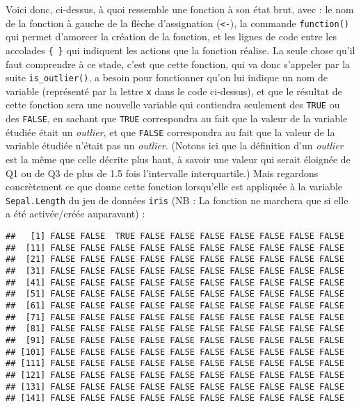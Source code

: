 \documentclass[
]{book}
\newenvironment{Shaded}{\begin{snugshade}}{\end{snugshade}}
\newcommand{\AttributeTok}[1]{\textcolor[rgb]{0.77,0.63,0.00}{#1}}
\newcommand{\FunctionTok}[1]{\textcolor[rgb]{0.00,0.00,0.00}{#1}}
\newcommand{\NormalTok}[1]{#1}
\newcommand{\SpecialCharTok}[1]{\textcolor[rgb]{0.00,0.00,0.00}{#1}}
\begin{document}
Voici donc, ci-dessus, à quoi ressemble une fonction à son état brut, avec : le nom de la fonction à gauche de la flèche d'assignation (\texttt{\textless{}-}), la commande \texttt{function()} qui permet d'amorcer la création de la fonction, et les lignes de code entre les accolades \texttt{\{\ \}} qui indiquent les actions que la fonction réalise. La seule chose qu'il faut comprendre à ce stade, c'est que cette fonction, qui va donc s'appeler par la suite \texttt{is\_outlier()}, a besoin pour fonctionner qu'on lui indique un nom de variable (représenté par la lettre \texttt{x} dans le code ci-dessus), et que le résultat de cette fonction sera une nouvelle variable qui contiendra seulement des \texttt{TRUE} ou des \texttt{FALSE}, en sachant que \texttt{TRUE} correspondra au fait que la valeur de la variable étudiée était un \emph{outlier}, et que \texttt{FALSE} correspondra au fait que la valeur de la variable étudiée n'était pas un \emph{outlier}. (Notons ici que la définition d'un \emph{outlier} est la même que celle décrite plus haut, à savoir une valeur qui serait éloignée de Q1 ou de Q3 de plus de 1.5 fois l'intervalle interquartile.) Mais regardons concrètement ce que donne cette fonction lorsqu'elle est appliquée à la variable \texttt{Sepal.Length} du jeu de données \texttt{iris} (NB : La fonction ne marchera que si elle a été activée/créée auparavant) :

\begin{Shaded}
\end{Shaded}

\begin{verbatim}
##   [1] FALSE FALSE  TRUE FALSE FALSE FALSE FALSE FALSE FALSE FALSE
##  [11] FALSE FALSE FALSE FALSE FALSE FALSE FALSE FALSE FALSE FALSE
##  [21] FALSE FALSE FALSE FALSE FALSE FALSE FALSE FALSE FALSE FALSE
##  [31] FALSE FALSE FALSE FALSE FALSE FALSE FALSE FALSE FALSE FALSE
##  [41] FALSE FALSE FALSE FALSE FALSE FALSE FALSE FALSE FALSE FALSE
##  [51] FALSE FALSE FALSE FALSE FALSE FALSE FALSE FALSE FALSE FALSE
##  [61] FALSE FALSE FALSE FALSE FALSE FALSE FALSE FALSE FALSE FALSE
##  [71] FALSE FALSE FALSE FALSE FALSE FALSE FALSE FALSE FALSE FALSE
##  [81] FALSE FALSE FALSE FALSE FALSE FALSE FALSE FALSE FALSE FALSE
##  [91] FALSE FALSE FALSE FALSE FALSE FALSE FALSE FALSE FALSE FALSE
## [101] FALSE FALSE FALSE FALSE FALSE FALSE FALSE FALSE FALSE FALSE
## [111] FALSE FALSE FALSE FALSE FALSE FALSE FALSE FALSE FALSE FALSE
## [121] FALSE FALSE FALSE FALSE FALSE FALSE FALSE FALSE FALSE FALSE
## [131] FALSE FALSE FALSE FALSE FALSE FALSE FALSE FALSE FALSE FALSE
## [141] FALSE FALSE FALSE FALSE FALSE FALSE FALSE FALSE FALSE FALSE
\end{verbatim}
\end{document}
